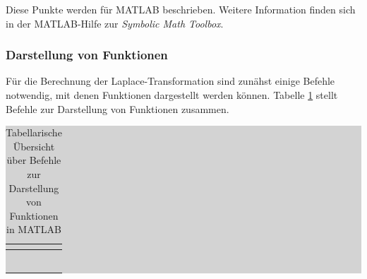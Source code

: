 \noindent Diese Punkte werden für MATLAB beschrieben. Weitere Information finden sich in der MATLAB-Hilfe zur \textit{Symbolic Math Toolbox}.


\subsubsection{Darstellung von Funktionen}

\noindent Für die Berechnung der Laplace-Transformation sind zunähst einige Befehle notwendig, mit denen Funktionen dargestellt werden können. Tabelle \ref{tab:foursix} stellt Befehle zur Darstellung von Funktionen zusammen.

\begin{table}[H]
\setlength{\arrayrulewidth}{.1em}
\caption{Tabellarische Übersicht über Befehle zur Darstellung von Funktionen in MATLAB}

\setlength{\fboxsep}{0pt}%
\colorbox{lightgray}{%
%
\begin{tabular}{| c | c |}
\hline

\parbox[c][0.3in][c]{2in}{\smallskip\centering\textbf{\selectfont{Befehl}}} & \parbox[c][0.3in][c]{5in}{\smallskip\centering\textbf{\selectfont{Beschreibung}}}\\ \hline

\parbox[c][0.8in][c]{2in}{} & \parbox[c][0.8in][c]{5in}{}\\ \hline

\parbox[c][0.3in][c]{2in}{} & 
\parbox[c][0.3in][c]{5in}{}\\ \hline

\parbox[c][0.3in][c]{2in}{} & \parbox[c][0.3in][c]{5in}{}\\
\hline

\parbox[c][0.3in][c]{2in}{\centering{+ - * /}} & \parbox[c][0.3in][c]{5in}{}\\
\hline

\parbox[c][0.3in][c]{2in}{} & \parbox[c][0.3in][c]{5in}{}\\
\hline

\parbox[c][0.45in][c]{2in}{} & 
\parbox[c][0.45in][c]{5in}{}\\
\hline

\end{tabular}%
}
\label{tab:foursix}
\end{table}

